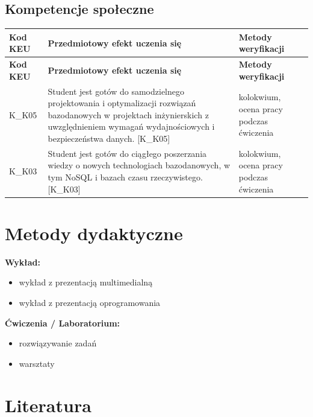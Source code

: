 \documentclass[12pt, a4paper]{article}
\newcommand{\thdrule}{\noalign{\global\setlength{\extrarowheight}{0pt}}}
\newcommand{\thdend}{\noalign{\global\setlength{\extrarowheight}{3pt}}}
\begin{document}
\subsection*{Kompetencje społeczne}
{\scriptsize
\begin{longtable}{m{1.6cm}m{9.0cm}m{4.2cm}}
\thdrule\toprule
\rowcolor{pjatkRed} {\color{white}\footnotesize\textbf{\vphantom{Ag}Kod KEU}} & {\color{white}\footnotesize\textbf{\vphantom{Ag}Przedmiotowy efekt uczenia się}} & {\color{white}\footnotesize\textbf{\vphantom{Ag}Metody weryfikacji}} \\
\midrule\thdend
\endfirsthead
\thdrule\toprule
\rowcolor{pjatkRed} {\color{white}\footnotesize\textbf{\vphantom{Ag}Kod KEU}} & {\color{white}\footnotesize\textbf{\vphantom{Ag}Przedmiotowy efekt uczenia się}} & {\color{white}\footnotesize\textbf{\vphantom{Ag}Metody weryfikacji}} \\
\midrule\thdend
\endhead
  \rowcolor{tableRowLight} K\_K05 & Student jest gotów do samodzielnego projektowania i optymalizacji rozwiązań bazodanowych w projektach inżynierskich z uwzględnieniem wymagań wydajnościowych i bezpieczeństwa danych. {[}K\_K05{]} & kolokwium, ocena pracy podczas ćwiczenia \\
  \rowcolor{tableRowAlt} K\_K03 & Student jest gotów do ciągłego poszerzania wiedzy o nowych technologiach bazodanowych, w tym NoSQL i bazach czasu rzeczywistego. {[}K\_K03{]} & kolokwium, ocena pracy podczas ćwiczenia \\
\bottomrule
\end{longtable}}

\section{Metody dydaktyczne}

\textbf{Wykład:}
\begin{itemize}
  \item wykład z prezentacją multimedialną
  \item wykład z prezentacją oprogramowania
\end{itemize}
\vspace{4pt}
\textbf{Ćwiczenia / Laboratorium:}
\begin{itemize}
  \item rozwiązywanie zadań
  \item warsztaty
\end{itemize}
\vspace{4pt}


\section{Literatura}
\end{document}
